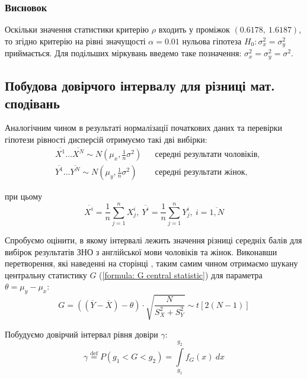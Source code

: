 \subsubsection{Висновок}
\label{page: ENG dispersion hypothesis}

Оскільки значення статистики критерію $\rho$ входить у проміжок $(0.6178,\ 1.6187)$, то згідно критерію 
на рівні значущості $\alpha=0.01$ нульова гіпотеза $H_0: \sigma_x^2=\sigma_y^2$ приймається. 
Для подільших міркувань введемо таке позначення: $\sigma_x^2=\sigma_y^2=\sigma^2$.

\subsection*{Побудова довірчого інтервалу для різниці мат. сподівань}

Аналогічним чином в результаті нормалізації початкових даних та перевірки гіпотези рівності дисперсій 
отримуємо такі дві вибірки: 
\begin{align}
    &\overline{X^1}\ldots \overline{X^N}\sim N(\mu_x,\tfrac{1}{n}\sigma^2) && \text{середні результати чоловіків,} \label{formula: ENG ND X} \\
    &\overline{Y^1}\ldots \overline{Y^N}\sim N(\mu_y,\tfrac{1}{n}\sigma^2) && \text{середні результати жінок,} \label{formula: ENG ND Y}
\end{align}

при цьому
\[ \overline{X^i}=\frac{1}{n}\sum\limits_{j=1}^nX^i_j,\ 
   \overline{Y^i}=\frac{1}{n}\sum\limits_{j=1}^nY^i_j,\ i=\overline{1,N} \]

Спробуємо оцінити, в якому інтервалі лежить значення різниці середніх балів для вибірок результатів ЗНО з 
англійської мови чоловіків та жінок. Виконавши перетворення, які наведенні на сторінці \pageref{page: seaching central statistic}, 
таким самим чином отримаємо шукану центральну статистику $G$ (\ref{formula: G central statistic}) для параметра $\theta=\mu_y-\mu_x:$
\begin{equation*}
    G=\left( (\overline{Y}-\overline{X})-\theta \right)\cdot \sqrt{\frac{N}{S_X^2+S_Y^2}}
    \sim t\left[ 2(N-1) \right]
\end{equation*}

Побудуємо довірчий інтервал рівня довіри $\gamma:$
\begin{equation*}
    \gamma \overset{\mathrm{def}}{=}P(g_1<G<g_2)=\int\limits_{g_1}^{g_2}f_G(x)\ dx
\end{equation*}

